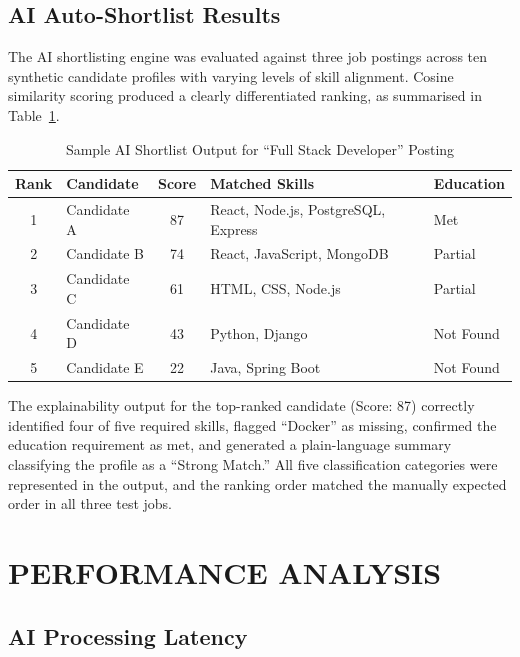 \documentclass[12pt,a4paper]{report}
\begin{document}
\subsection{AI Auto-Shortlist Results}

The AI shortlisting engine was evaluated against three job postings across ten synthetic candidate profiles with varying levels of skill alignment. Cosine similarity scoring produced a clearly differentiated ranking, as summarised in Table~\ref{tab:airesults}.

\begin{table}[H]
    \centering
    \caption{Sample AI Shortlist Output for ``Full Stack Developer'' Posting}
    \label{tab:airesults}
    \begin{tabular}{|c|l|c|l|l|}
        \hline
        \textbf{Rank} & \textbf{Candidate} & \textbf{Score} & \textbf{Matched Skills} & \textbf{Education} \\
        \hline
        1 & Candidate A & 87 & React, Node.js, PostgreSQL, Express & Met \\
        2 & Candidate B & 74 & React, JavaScript, MongoDB & Partial \\
        3 & Candidate C & 61 & HTML, CSS, Node.js & Partial \\
        4 & Candidate D & 43 & Python, Django & Not Found \\
        5 & Candidate E & 22 & Java, Spring Boot & Not Found \\
        \hline
    \end{tabular}
\end{table}

The explainability output for the top-ranked candidate (Score: 87) correctly identified four of five required skills, flagged ``Docker'' as missing, confirmed the education requirement as met, and generated a plain-language summary classifying the profile as a ``Strong Match.'' All five classification categories were represented in the output, and the ranking order matched the manually expected order in all three test jobs.

\section{PERFORMANCE ANALYSIS}

\subsection{AI Processing Latency}
\end{document}
